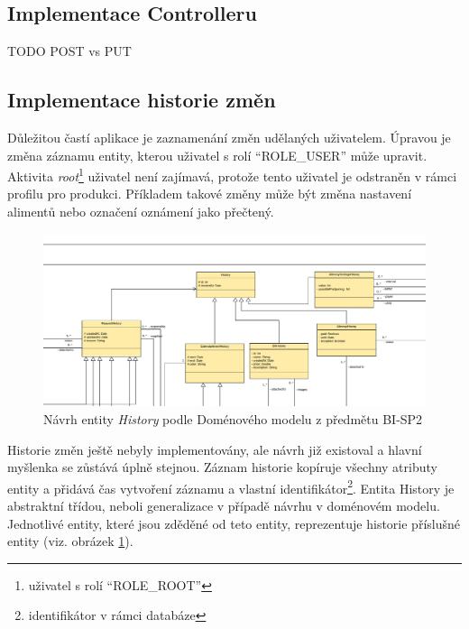     \subsection{Implementace Controlleru}
        TODO POST vs PUT
    
    \subsection{Implementace historie změn}
        Důležitou častí aplikace je zaznamenání změn udělaných uživatelem. Úpravou je změna záznamu entity, kterou uživatel s rolí \enquote{ROLE\_USER} může upravit. Aktivita \textit{root}\footnote{uživatel s rolí \enquote{ROLE\_ROOT}} uživatel není zajímavá, protože tento uživatel je odstraněn v rámci profilu pro produkci. Příkladem takové změny může být změna nastavení alimentů nebo označení oznámení jako přečtený.
    
        \begin{figure}\centering
	        \includegraphics[width=1.0\textwidth]{pdfs/History1}
	        \caption[Návrh entity History]{Návrh entity \textit{History} podle Doménového modelu z předmětu BI-SP2}\label{image:History1}
        \end{figure}
        Historie změn ještě nebyly implementovány, ale návrh již existoval a hlavní myšlenka se zůstává úplně stejnou. Záznam historie kopíruje všechny atributy entity a přidává čas vytvoření záznamu a vlastní identifikátor\footnote{identifikátor v rámci databáze}. Entita History je abstraktní třídou, neboli generalizace v případě návrhu v doménovém modelu. Jednotlivé entity, které jsou zděděné od teto entity, reprezentuje historie příslušné entity (viz. obrázek \ref{image:History1}). 
    
